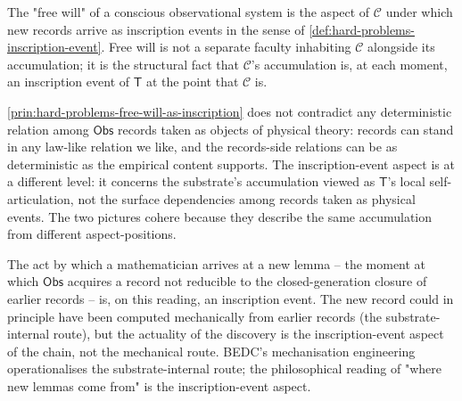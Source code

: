 \begin{principle}
\label{prin:hard-problems-free-will-as-inscription}
The "free will" of a conscious observational system is the aspect of $\mathcal{C}$ under which new records arrive as inscription events in the sense of \autoref{def:hard-problems-inscription-event}. Free will is not a separate faculty inhabiting $\mathcal{C}$ alongside its accumulation; it is the structural fact that $\mathcal{C}$'s accumulation is, at each moment, an inscription event of $\mathsf{T}$ at the point that $\mathcal{C}$ is.
\end{principle}

\begin{remark}
\label{rem:hard-problems-compatibility-with-determinism}
\autoref{prin:hard-problems-free-will-as-inscription} does not contradict any deterministic relation among $\mathsf{Obs}$ records taken as objects of physical theory: records can stand in any law-like relation we like, and the records-side relations can be as deterministic as the empirical content supports. The inscription-event aspect is at a different level: it concerns the substrate's accumulation viewed as $\mathsf{T}$'s local self-articulation, not the surface dependencies among records taken as physical events. The two pictures cohere because they describe the same accumulation from different aspect-positions.
\end{remark}

\begin{example}
\label{ex:hard-problems-mathematical-creativity}
The act by which a mathematician arrives at a new lemma -- the moment at which $\mathsf{Obs}$ acquires a record not reducible to the closed-generation closure of earlier records -- is, on this reading, an inscription event. The new record could in principle have been computed mechanically from earlier records (the substrate-internal route), but the actuality of the discovery is the inscription-event aspect of the chain, not the mechanical route. BEDC's mechanisation engineering operationalises the substrate-internal route; the philosophical reading of "where new lemmas come from" is the inscription-event aspect.
\end{example}

